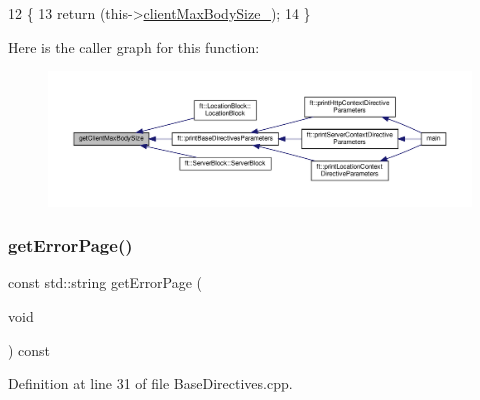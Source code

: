 \begin{DoxyCode}
12     \{
13         \textcolor{keywordflow}{return} (this->\hyperlink{classft_1_1_base_directives_ad65c2594d2a90ca065d410dfd4066a19}{clientMaxBodySize\_});
14     \}
\end{DoxyCode}
Here is the caller graph for this function\+:
\nopagebreak
\begin{figure}[H]
\begin{center}
\leavevmode
\includegraphics[width=350pt]{classft_1_1_base_directives_a930398ba1e4b99b2ba01a60dcda0c923_icgraph}
\end{center}
\end{figure}
\mbox{\label{classft_1_1_base_directives_a3cb0c21f17781de392d5ee09d7190caf}} 
\subsubsection{\texorpdfstring{get\+Error\+Page()}{getErrorPage()}}
{\footnotesize\ttfamily const std\+::string get\+Error\+Page (\begin{DoxyParamCaption}\item[{void}]{ }\end{DoxyParamCaption}) const}



Definition at line 31 of file Base\+Directives.\+cpp.


